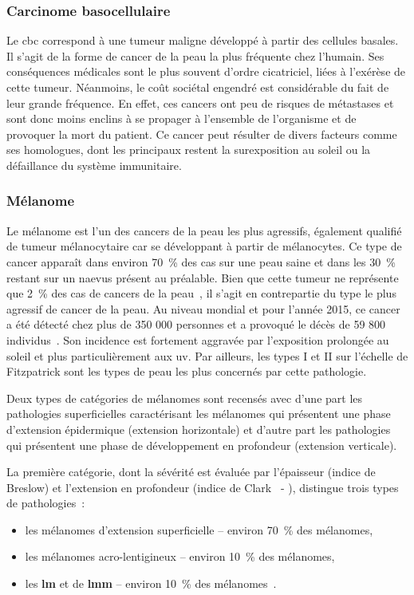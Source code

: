 \subsubsection{Carcinome basocellulaire}	
Le \gls{cbc} correspond à une tumeur maligne développé à partir des cellules basales. Il s’agit de la forme de cancer de la peau la plus fréquente chez l'humain. Ses conséquences médicales sont le plus souvent d'ordre cicatriciel, liées à l'exérèse de cette tumeur. Néanmoins, le coût sociétal engendré est considérable du fait de leur grande fréquence. En effet, ces cancers ont peu de risques de métastases et sont donc moins enclins à se propager à l’ensemble de l’organisme et de provoquer la mort du patient. Ce cancer peut résulter de divers facteurs comme ses homologues, dont les principaux restent la surexposition au soleil ou la défaillance du système immunitaire.\par

\subsubsection{Mélanome}
Le mélanome est l'un des cancers de la peau les plus agressifs, également qualifié de tumeur mélanocytaire car se développant à partir de mélanocytes. Ce type de cancer apparaît dans environ 70~\% des cas sur une peau saine et dans les 30~\% restant sur un naevus présent au préalable. Bien que cette tumeur ne représente que 2~\% des cas de cancers de la peau~\cite{Tortora2012}, il s’agit en contrepartie du type le plus agressif de cancer de la peau. Au niveau mondial et pour l'année 2015, ce cancer a été détecté chez plus de 350 000 personnes et a provoqué le décès de 59 800 individus~\cite{Karimkhani2017}. Son incidence est fortement aggravée par l’exposition prolongée au soleil et plus particulièrement aux \gls{uv}. Par ailleurs, les types I et II sur l’échelle de Fitzpatrick sont les types de peau les plus concernés par cette pathologie.\par

Deux types de catégories de mélanomes sont recensés avec d’une part les pathologies superficielles caractérisant les mélanomes qui présentent une phase d’extension épidermique (extension horizontale) et d'autre part les pathologies qui présentent une phase de développement en profondeur (extension verticale).\par

La première catégorie, dont la sévérité est évaluée par l'épaisseur (indice de Breslow) et l'extension en profondeur (indice de Clark~\cite{Clark1969} - ), distingue trois types de pathologies~:
\begin{itemize}
    \item les mélanomes d'extension superficielle – environ 70~\% des mélanomes,
    \item les mélanomes acro-lentigineux – environ 10~\% des mélanomes,
    \item les \textbf{\acrlong{lm}} et de \textbf{\acrlong{lmm}} – environ 10~\% des mélanomes~\cite{LeGal2011}.
\end{itemize}


